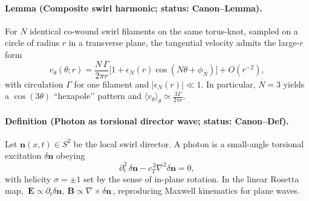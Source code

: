 \documentclass[10pt,reprint,aps,onecolumn,nofootinbib]{revtex4-2}
\begin{document}

    \paragraph{Lemma (Composite swirl harmonic; status: Canon–Lemma).}
        For $N$ identical co-wound swirl filaments on the same torus-knot, sampled on a circle of radius $r$ in a transverse plane, the tangential velocity admits the large-$r$ form
        \[
            v_\theta(\theta;r)=\frac{N\,\Gamma}{2\pi r}\Big[1+\epsilon_N(r)\cos(N\theta+\phi_N)\Big]+O(r^{-2}),
        \]
        with circulation $\Gamma$ for one filament and $|\epsilon_N(r)|\ll 1$. In particular, $N=3$ yields a $\cos(3\theta)$ “hexapole’’ pattern and $\langle v_\theta\rangle_\theta\simeq \tfrac{3\Gamma}{2\pi r}$.

    \paragraph{Definition (Photon as torsional director wave; status: Canon–Def).}
        Let $\mathbf{n}(x,t)\in S^2$ be the local swirl director. A photon is a small-angle torsional excitation $\delta\mathbf{n}$ obeying
        \[
            \partial_t^2\,\delta\mathbf{n}-c_T^{\,2}\nabla^2\delta\mathbf{n}=0,
        \]
        with helicity $\sigma=\pm1$ set by the sense of in-plane rotation. In the linear Rosetta map,
        $\ \mathbf{E}\propto \partial_t\delta\mathbf{n},\ \mathbf{B}\propto \nabla\times\delta\mathbf{n}\,$,
        reproducing Maxwell kinematics for plane waves.
\end{document}
